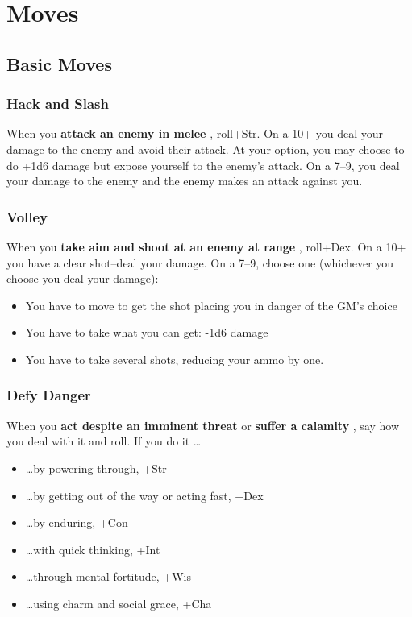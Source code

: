 \chapter{Moves}
\section{Basic Moves}
\subsection{Hack and Slash}


 When you \textbf{attack an enemy in melee}
, roll+Str. On a 10+ you deal your damage to the enemy and avoid their attack. At your option, you may choose to do +1d6 damage but expose yourself to the enemy's attack. On a 7--9, you deal your damage to the enemy and the enemy makes an attack against you.
\subsection{Volley}


 When you \textbf{take aim and shoot at an enemy at range}
, roll+Dex. On a 10+ you have a clear shot--deal your damage. On a 7--9, choose one (whichever you choose you deal your damage):
\begin{itemize}
\item You have to move to get the shot placing you in danger of the GM's choice
\item You have to take what you can get: -1d6 damage
\item You have to take several shots, reducing your ammo by one.

\end{itemize}
\subsection{Defy Danger}


 When you \textbf{act despite an imminent threat}
 or \textbf{suffer a calamity}
, say how you deal with it and roll. If you do it \ldots 
\begin{itemize}
\item  \ldots by powering through, +Str
\item  \ldots by getting out of the way or acting fast, +Dex
\item  \ldots by enduring, +Con
\item  \ldots with quick thinking, +Int
\item  \ldots through mental fortitude, +Wis
\item  \ldots using charm and social grace, +Cha

\end{itemize}


